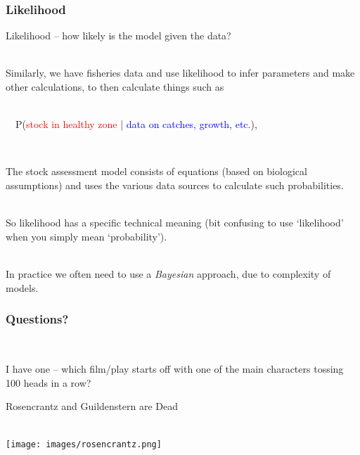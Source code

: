\begin{frame}
\frametitle{Likelihood}

Likelihood -- \alert{how likely is the model given the data?}

~\\

Similarly, we have fisheries data and use likelihood to infer parameters and  make other
calculations, to then calculate things such as

~\\

~~P(\textcolor{red}{stock in healthy zone} | \textcolor{blue}{data on catches,
  growth, etc.}),

~\\


\pause

The \alert{stock assessment model} consists of equations (based on biological
assumptions) and uses the various data sources to calculate such probabilities.
~\\

\pause

~\\

So likelihood has a specific technical meaning (bit confusing to use `likelihood' when you simply mean `probability').

~\\

In practice we often need to use a \emph{Bayesian} approach, due to complexity
of models.





\end{frame}


\begin{frame}

\frametitle{Questions?}

~\\

\pause

I have one -- which film/play starts off with one of the main characters tossing 100
heads in a row?

\pause

Rosencrantz and Guildenstern are Dead

~\\

\texttt{[image: images/rosencrantz.png]}

\end{frame}

